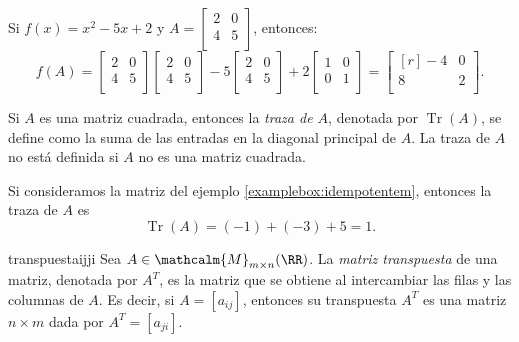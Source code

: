 \begin{examplebox}{}{}
    Si $f(x) = x^2 -5x +2$ y $A = \begin{bmatrix}
        2 & 0 \\
        4 & 5 \\
    \end{bmatrix}$, entonces:
    $$f(A) = \begin{bmatrix}
        2 & 0 \\
        4 & 5 \\
    \end{bmatrix} \begin{bmatrix}
        2 & 0 \\
        4 & 5 \\
    \end{bmatrix} -5 \begin{bmatrix}
        2 & 0 \\
        4 & 5 \\
    \end{bmatrix} +2 \begin{bmatrix}
        1 & 0 \\
        0 & 1 \\
    \end{bmatrix} = \begin{bmatrix*}[r]
        -4 & 0 \\
        8 & 2 \\
    \end{bmatrix*}.$$
\end{examplebox}

\begin{definicion}{}{}
    Si $A$ es una matriz cuadrada, entonces la \textit{traza de $A$}, denotada por $\operatorname{Tr}(A)$, se define como la suma de las entradas en la diagonal principal de $A$. La traza de $A$ no está definida si $A$ no es una matriz cuadrada.
\end{definicion}

\begin{examplebox}{}{}
    Si consideramos la matriz del ejemplo \ref{examplebox:idempotentem}, entonces la traza de $A$ es
    $$\operatorname{Tr}(A) = (-1) + (-3) + 5 = 1.$$
\end{examplebox}

\begin{definicion}{}{transpuestaijji}
    Sea $A \in \mathcalm{M}_{m \times n}(\RR)$. La \emph{matriz transpuesta} de una matriz, denotada por $A^T$, es la matriz que se obtiene al intercambiar las filas y las columnas de $A$. Es decir, si $A = [ a_{ij} ]$, entonces su transpuesta $A^T$ es una matriz $n \times m$ dada por $A^T = [ a_{ji} ]$.
\end{definicion}


